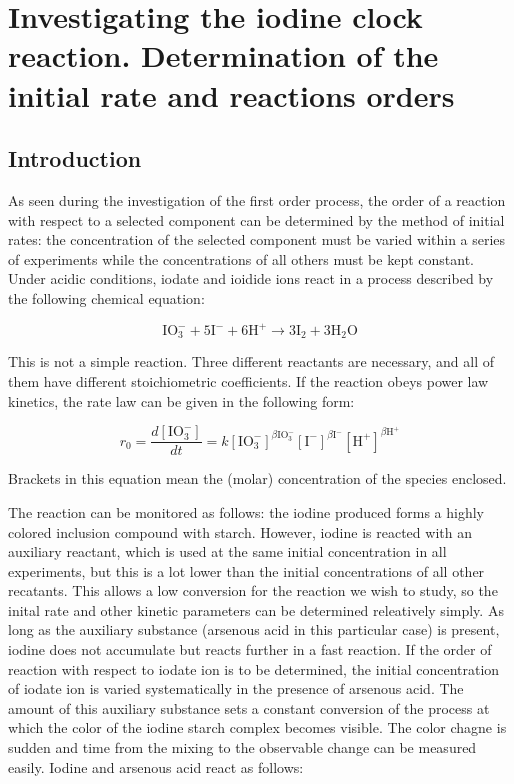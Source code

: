 \fancyhead[LO,RE]{\thesection}
\fancyfoot[LE,RO]{\thepage}
	
\section{Investigating the iodine clock reaction. Determination of the initial rate and reactions orders}
\subsection{Introduction}

As seen during the investigation of the first order process, the order of a reaction with respect to a selected component can be determined by the method of initial rates: the concentration of the selected component must be varied within a series of experiments while the concentrations of all others must be kept constant. Under acidic conditions, iodate and ioidide ions react in a process described by the following chemical equation:

\begin{equation}
\text{IO}_{3}^{-} + 5 \text{I}^{-} + 6 \text{H}^{+}  \longrightarrow 3 \text{I}_{2} + 3 \text{H}_{2} \text{O}
\end{equation}

This is not a simple reaction. Three different reactants are necessary, and all of them have different stoichiometric coefficients. If the reaction obeys power law kinetics, the rate law can be given in the following form:

\begin{equation}
r_0 =\frac{d[\text{IO}_{3}^{-}]}{dt} = k[\text{IO}_{3}^{-}]^{\beta \text{IO}_{3}^{-}} [\text{I}^{-}]^{\beta \text{I}^{-}} [\text{H}^{+}]^{\beta \text{H}^{+}}
\end{equation}

Brackets in this equation mean the (molar) concentration of the species enclosed.

The reaction can be monitored as follows:  the iodine produced forms a highly colored inclusion compound with starch. However, iodine is reacted with an auxiliary reactant, which is used at the same initial concentration in all experiments, but this is a lot lower than the initial  concentrations of all other recatants. This allows a low conversion for the reaction we wish to study, so the inital rate and other kinetic parameters can be determined releatively simply. As long as the auxiliary substance (arsenous acid in this particular case) is present, iodine does not accumulate but reacts further in a fast reaction. If the order of reaction with respect to iodate ion is to be determined, the initial concentration of iodate ion is varied systematically in the presence of arsenous acid. The amount of this auxiliary substance sets a constant conversion of the process at which the color of the iodine starch complex becomes visible. The color chagne is sudden and time from the mixing to the observable change can be measured easily. Iodine and arsenous acid react as follows:

